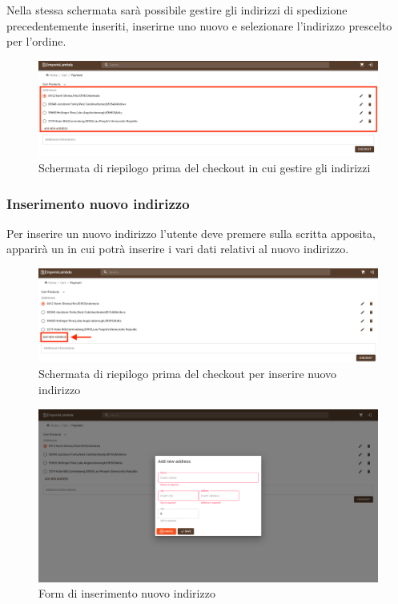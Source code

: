 Nella stessa schermata sarà possibile gestire gli indirizzi di spedizione precedentemente inseriti, inserirne uno nuovo e selezionare l'indirizzo prescelto per l'ordine.
\begin{figure}[H]
	\centering
	\includegraphics[scale=0.25]{Immagini/Acquirente/payment.customer.png}
	\caption{Schermata di riepilogo prima del checkout in cui gestire gli indirizzi}
	\label{fig:CartAddress}
\end{figure}
\subsubsection{Inserimento nuovo indirizzo}
Per inserire un nuovo indirizzo l'utente deve premere sulla scritta apposita, apparirà un  in cui potrà inserire i vari dati relativi al nuovo indirizzo.
\begin{figure}[H]
	\centering
	\includegraphics[scale=0.25]{Immagini/Acquirente/payment.addressnew.png}
	\caption{Schermata di riepilogo prima del checkout per inserire nuovo indirizzo}
	\label{fig:NewAddress}
\end{figure}
\begin{figure}[H]
	\centering
	\includegraphics[scale=0.25]{Immagini/Acquirente/payment-new-address.customer.png}
	\caption{Form di inserimento nuovo indirizzo}
	\label{fig:CartnewAddress}
\end{figure}
